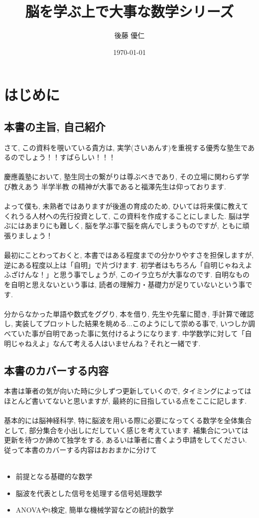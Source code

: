 \documentclass[11pt,a4paper]{jsarticle}
\title{脳を学ぶ上で大事な数学シリーズ}
\author{後藤 優仁}
\date{\today}
\begin{document}
\maketitle
%
%
\section{はじめに}
\subsection{本書の主旨, 自己紹介}
さて, この資料を覗いている貴方は, 実学(さいあんす)を重視する優秀な塾生であるのでしょう！！すばらしい！！！\\
\\
慶應義塾において, 塾生同士の繋がりは尊ぶべきであり, その立場に関わらず学び教えあう 半学半教 の精神が大事であると福澤先生は仰っております. \\
\\
よって僕も, 未熟者ではありますが後進の育成のため, ひいては将来僕に教えてくれうる人材への先行投資として, この資料を作成することにしました. 脳は学ぶにはあまりにも難しく, 脳を学ぶ事で脳を病んでしまうものですが, ともに頑張りましょう！ \\
\\
最初にことわっておくと, 本書ではある程度までの分かりやすさを担保しますが, 逆にある程度以上は「自明」で片づけます. 初学者はもちろん「自明じゃねえよふざけんな！」と思う事でしょうが, このイラ立ちが大事なのです. 自明なものを自明と思えないという事は, 読者の理解力・基礎力が足りていないという事です. \\\\
分からなかった単語や数式をググり, 本を借り, 先生や先輩に聞き, 手計算で確認し, 実装してプロットした結果を眺める...このようにして崇める事で, いつしか調べていた事が自明であった事に気付けるようになります. 中学数学に対して「自明じゃねえよ」なんて考える人はいませんね？それと一緒です.\\

\subsection{本書のカバーする内容}
本書は筆者の気が向いた時に少しずつ更新していくので, タイミングによってはほとんど書いてないと思いますが, 最終的に目指している点をここに記します.\\
\\
基本的には脳神経科学, 特に脳波を用いる際に必要になってくる数学を全体集合として, 部分集合を小出しにだしていく感じを考えています. 補集合については更新を待つか諦めて独学をする, あるいは筆者に書くよう申請をしてください. 従って本書のカバーする内容はおおまかに分けて\\
\\
\begin{itemize}
 \item 前提となる基礎的な数学
 \item 脳波を代表とした信号を処理する信号処理数学
 \item ANOVAやt検定, 簡単な機械学習などの統計的数学
\end{itemize}
\end{document}
